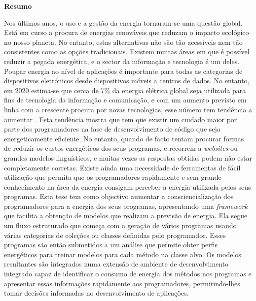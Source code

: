 \vspace*{2cm}
\begin{center}
\Large \bf Resumo
\end{center}
\vspace*{1cm} \setlength{\baselineskip}{0.6cm}

Nos últimos anos, o uso e a gestão da energia tornaram-se uma questão global. Está em curso a procura de energias renováveis que reduzam o impacto ecológico no nosso planeta. No entanto, estas alternativas não são tão acessíveis nem tão consistentes como as opções tradicionais. Existem muitas áreas em que é possível reduzir a pegada energética, e o sector da informação e tecnologia é um deles.
Poupar energia ao nível de aplicações é importante para todas as categorias de dispositivos eletrónicos desde dispositivos móveis a centros de dados. No entanto, em 2020 estima-se que cerca de 7\% da energia elétrica global seja utilizada  para fins de tecnologia da informação e comunicação, e com um aumento previsto em linha com a crescente procura por novas tecnologias, esse número tem tendência a aumentar .
Esta tendência mostra que tem que existir um cuidado maior por parte dos programadores na fase de desenvolvimento de código que seja energeticamente eficiente. No entanto, quando de facto tentam procurar formas de reduzir os custos energéticos dos seus programas, e recorrem a \textit{websites} ou grandes modelos linguísticos, e muitas vezes as respostas obtidas podem não estar completamente corretas. Existe ainda uma necessidade de ferramentas de fácil utilização que permita que os programadores rapidamente e sem grande conhecimento na área da energia consigam perceber a energia utilizada pelos seus programas.
Esta tese tem como objectivo aumentar a consciencialização dos programadores para a energia dos seus programas, apresentando uma \textit{framework} que facilita a obtenção de modelos que realizam a previsão de energia. Ela segue um fluxo estruturado que começa com a geração de vários programas usando várias categorias de coleções ou classes definidas pelo programador. Esses programas são então submetidos a um análise que permite obter perfis energéticos para treinar modelos para cada método na classe alvo.
Os modelos resultantes são integrados numa extensão de ambiente de desenvolvimento integrado capaz de identificar o consumo de energia dos métodos nos programas e apresentar essas informações rapidamente aos programadores, permitindo-lhes tomar decisões informadas no desenvolvimento de aplicações.
